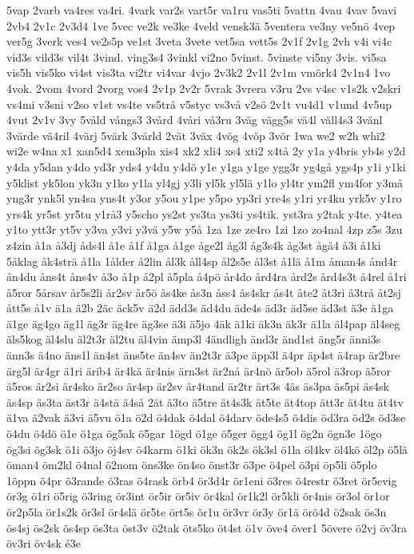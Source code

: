 {5vap
2varb
va4res
va4ri.
4vark
var2s
vart5r
va1ru
vas5ti
5vattn
4vau
4vav
5vavi
2vb4
2v1c
2v3d4
1ve
5vec
ve2k
ve3ke
4veld
vensk3ä
5ventera
ve3ny
ve5nö
4vep
ver5g
3verk
ves4
ve2s5p
ve1st
3veta
3vete
vet5sa
vett5s
2v1f
2v1g
2vh
v4i
vi4c
vid3s
vild3s
vil4t
3vind.
ving3s4
3vinkl
vi2no
5vinst.
5vinste
vi5ny
3vis.
vi5sa
vis5h
vis5ko
vi4st
vis3ta
vi2tr
vi4var
4vjo
2v3k2
2v1l
2v1m
vmörk4
2v1n4
1vo
4vok.
2vom
4vord
2vorg
vos4
2v1p
2v2r
5vrak
3vrera
v3ru
2vs
v4sc
v1s2k
v2skri
vs4mi
v3sni
v2so
v1st
vs4te
vs5trå
v5styc
vs3vå
v2sö
2v1t
vu4d1
v1und
4v5up
4vut
2v1v
3vy
5våld
vångs3
3vård
4våri
vå3ru
3väg
vägg5s
vä4l
väll4s3
3vänl
3värde
vä4ril
4värj
5värk
3värld
2vät
3väx
4vög
4vöp
3vör
1wa
we2
w2h
whi2
wi2e
w4na
x1
xan5d4
xem3pla
xis4
xk2
xli4
xs4
xti2
x4tå
2y
y1a
y4bris
yb4s
y2d
y4da
y5dan
y4do
yd3r
yds4
y4du
y4dö
y1e
y1ga
y1ge
ygg3r
yg4gå
ygs4p
y1i
y1ki
y5klist
yk5lon
yk3n
y1ko
y1la
yl4gj
y3li
yl5k
yl5lä
y1lo
yl4tr
ym2fl
ym4for
y3må
yng3r
ynk5l
yn4sa
yns4t
y3or
y5ou
y1pe
y5po
yp3ri
yre4s
y1ri
yr4ku
yrk5v
y1ro
yrs4k
yr5st
yr5tu
y1rå3
y5scho
ys2st
ys3ta
ys3ti
ys4tik.
yst3ra
y2tak
y4te.
y4tea
y1to
ytt3r
yt5v
y3va
y3vi
y3vä
y5w
y5å
1za
1ze
ze4ro
1zi
1zo
zo4nal
4zp
z5s
3zu
z4zin
å1a
å3dj
åds4l
å1e
å1f
å1ga
å1ge
åge2l
åg3l
åg3s4k
åg3st
ågå4
å3i
å1ki
5åklag
åk4strä
å1la
1ålder
å2lin
ål3k
åll4sp
ål2s5e
ål3st
å1lä
å1m
åman4s
ånd4r
ån4du
åns4t
åns4v
å3o
å1p
å2pl
å5pla
å4pö
år4do
ård4ra
ård2s
ård4s3t
å4rel
å1ri
å5ror
5årsav
år5s2li
år2sv
år5ö
ås4ke
ås3n
åss4
ås4skr
ås4t
åte2
åt3ri
å3trå
åt2sj
ått5s
å1v
ä1a
ä2b
2äc
äck5v
ä2d
ädd3s
äd4du
äde4s
äd3r
äd5se
äd3st
ä3e
ä1ga
ä1ge
äg4go
äg1l
äg3r
äg4re
äg3se
ä3i
ä5jo
4äk
ä1ki
äk3n
äk3r
ä1la
äl4pap
äl4seg
äls5kog
äl4slu
äl2t3r
äl2tu
äl4vin
ämp3l
4ändligh
änd3r
änd1st
äng5r
änni3s
änn3s
ä4no
äns1l
än4st
äns5te
än4sv
än2t3r
ä3pe
äpp3l
ä4pr
äp4st
ä4rap
är2bre
ärg5l
är4gr
ä1ri
ärib4
är4kä
är4nis
ärn3st
är2nå
är4nö
är5ob
ä5rol
ä3rop
ä5ror
ä5ros
är2si
är4sko
är2so
är4sp
är2sv
är4tand
är2tr
ärt3s
4äs
äs3pa
äs5pi
äs4sk
äs4sp
äs3ta
äst3r
ä4stä
ä4så
2ät
ä3to
ä5tre
ät4s3k
ät5te
ät4top
ätt3r
ät4tu
ät4tv
ä1va
ä2vak
ä3vi
ä5vu
ö1a
ö2d
ö4dak
ö4dal
ö4darv
öde4s5
ö4dis
öd3ra
öd2s
öd3se
ö4du
ö4dö
ö1e
ö1ga
ög5ak
ö5gar
1ögd
ö1ge
ö5ger
ögg4
ög1l
ög2n
ögn3e
1ögo
ög3si
ög3sk
ö1i
ö3jo
öj4sv
ö4karm
ö1ki
ök3n
ök2s
ök3sl
ö1la
öl4kv
öl4kö
öl2p
ö5lä
öman4
öm2kl
ö4nal
ö2nom
öns3ke
ön4so
önst3r
ö3pe
ö4pel
ö3pi
öp5li
ö5plo
1öppn
ö4pr
ö3rande
ö3ras
ö4rask
örb4
ör3d4r
ör1eni
ö3res
ö4restr
ö3ret
ör5evig
ör3g
ö1ri
ö5rig
ö3ring
ör3int
ör5ir
ör5iv
ör4kal
ör1k2l
ör5kli
ör4nis
ör3ol
ör1or
ör2p5la
ör1s2k
ör3sl
ör4slä
ör5te
ört5s
ör1u
ör3vr
ör3y
ör1ä
örö4d
ö2sak
ös3n
ös4sj
ös2sk
ös4sp
ös3ta
öst3v
ö2tak
öts5ko
öt4st
ö1v
öve4
över1
5övere
ö2vj
öv3ra
öv3ri
öv4sk
é3e
}
